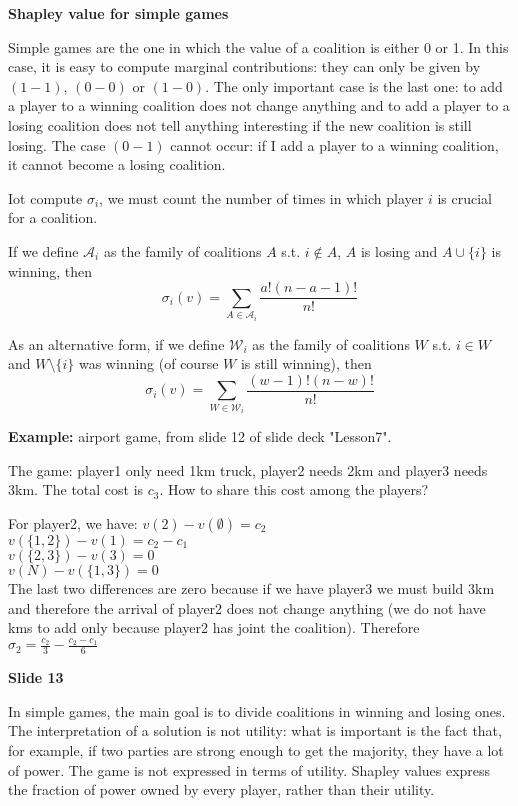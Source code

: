 \bigskip
\noindent \textbf{Shapley value for simple games}

\noindent Simple games are the one in which the value of a coalition is either 
0 or 1. In this case, it is easy to compute marginal contributions: they can 
only be given by $(1-1)$, $(0 - 0)$ or $(1 - 0)$. The only important case is the 
last one: to add a player to a winning coalition does not change anything and 
to add a player to a losing coalition does not tell anything interesting if 
the new coalition is still losing. 
The case $(0 - 1)$ cannot occur: if I add a player to a winning coalition, it 
cannot become a losing coalition.

\noindent Iot compute $\sigma_i$, we must count the number of times in which 
player $i$ is crucial for a coalition.

\bigskip
\noindent If we define $\mathcal{A}_i$ as the family of coalitions $A$ s.t. $i \notin A$, $A$ is losing and $A \cup \{i\}$ is winning, then
\[
	\sigma_i(v) = \sum_{A \in \mathcal{A}_i}\frac{a!(n-a-1)!}{n!}
\]

\noindent As an alternative form, if we define $\mathcal{W}_i$ as the family of coalitions $W$ s.t. $i \in W$ and $W \setminus \{i\}$ was winning (of course $W$ is still winning), then
\[
	\sigma_i(v) = \sum_{W \in \mathcal{W}_i}\frac{(w-1)!(n-w)!}{n!}
\]

\bigskip
\noindent \textbf{Example:} airport game, from slide 12 of slide deck "Lesson7".

\noindent The game: player1 only need 1km truck, player2 needs 2km and player3 
needs 3km. The total cost is $c_3$. How to share this cost among the players? 

\noindent For player2, we have:
$v(2) - v(\emptyset) = c_2$\\
$v(\{1,2\}) - v(1) = c_2 - c_1$\\
$v(\{2,3\}) - v(3) = 0$\\
$v(N) - v(\{1,3\}) = 0$\\
The last two differences are zero because if we have player3 we must build 
3km and therefore the arrival of player2 does not change anything (we do not 
have kms to add only because player2 has joint the coalition). 
Therefore $\sigma_2 = \frac{c_2}{3} - \frac{c_2-c_1}{6}$

\bigskip
\noindent \textbf{Slide 13}

\noindent In simple games, the main goal is to divide coalitions in winning 
and losing ones. The interpretation of a solution is not utility: what is 
important is the fact that, for example, if two parties are strong enough to 
get the majority, they have a lot of power. The game is not expressed in terms 
of utility. Shapley values express the fraction of power owned by every player, 
rather than their utility.

